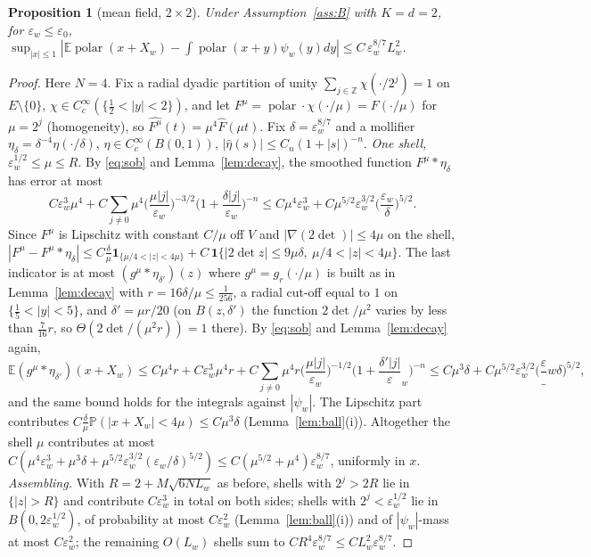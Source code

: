 \documentclass[10pt]{article}
\newtheorem{proposition}[theorem]{Proposition}
\theoremstyle{definition}
\theoremstyle{remark}
\newcommand{\Z}{\mathbb{Z}}
\newcommand{\E}{\mathbb{E}}
\newcommand{\Prob}{\mathbb{P}}
\newcommand{\polar}{\operatorname{polar}}
\newcommand{\ew}{\varepsilon_w}
\newcommand{\Lw}{L_w}
\begin{document}
\begin{proposition}[mean field, $2\times2$]\label{prop:field2}
Under Assumption~\ref{ass:B} with $K=d=2$, for $\ew\le\varepsilon_0$,
$\sup_{|x|\le1}|\E\polar(x+X_w)-\int\polar(x+y)\psi_w(y)dy|\le C\,\ew^{8/7}\Lw^2$.
\end{proposition}
\begin{proof}
Here $N=4$. Fix a radial dyadic partition of unity $\sum_{j\in\Z}\chi(\cdot/2^j)=1$ on $E\setminus\{0\}$,
$\chi\in C_c^\infty(\{\frac12<|y|<2\})$, and let $F^\mu=\polar\cdot\chi(\cdot/\mu)=F(\cdot/\mu)$ for $\mu=2^j$ (homogeneity),
so $\widehat{F^\mu}(t)=\mu^4\widehat F(\mu t)$. Fix $\delta=\ew^{8/7}$ and a mollifier $\eta_\delta=\delta^{-4}\eta(\cdot/\delta)$,
$\eta\in C_c^\infty(B(0,1))$, $|\widehat\eta(s)|\le C_n(1+|s|)^{-n}$. \emph{One shell,} $\ew^{1/2}\le\mu\le R$.
By \eqref{eq:sob} and Lemma~\ref{lem:decay}, the smoothed function $F^\mu*\eta_\delta$ has error at most
\[
C\ew^3\mu^4+C\sum_{j\ne0}\mu^4\Big(\frac{\mu|j|}{\ew}\Big)^{-3/2}\Big(1+\frac{\delta|j|}{\ew}\Big)^{-n}
\le C\mu^4\ew^3+C\mu^{5/2}\ew^{3/2}\Big(\frac{\ew}\delta\Big)^{5/2}.
\]
Since $F^\mu$ is Lipschitz with constant $C/\mu$ off $V$ and $|\nabla(2\det)|\le4\mu$ on the shell,
$|F^\mu-F^\mu*\eta_\delta|\le C\frac\delta\mu\mathbf 1_{\{\mu/4<|z|<4\mu\}}+C\,\mathbf 1\{|2\det z|\le9\mu\delta,\ \mu/4<|z|<4\mu\}$.
The last indicator is at most $(g^\mu*\eta_{\delta'})(z)$ where $g^\mu=g_r(\cdot/\mu)$ is built as in
Lemma~\ref{lem:decay} with $r=16\delta/\mu\le\frac1{256}$, a radial cut-off equal to $1$ on $\{\frac15<|y|<5\}$, and
$\delta'=\mu r/20$ (on $B(z,\delta')$ the function $2\det/\mu^2$ varies by less than $\frac7{16}r$, so
$\Theta(2\det/(\mu^2r))=1$ there). By \eqref{eq:sob} and Lemma~\ref{lem:decay} again,
\[
\E(g^\mu*\eta_{\delta'})(x+X_w)\le C\mu^4r+C\ew^3\mu^4r+C\sum_{j\ne0}\mu^4r\Big(\frac{\mu|j|}{\ew}\Big)^{-1/2}\Big(1+\frac{\delta'|j|}\ew\Big)^{-n}
\le C\mu^3\delta+C\mu^{5/2}\ew^{3/2}\Big(\frac\ew\delta\Big)^{5/2},
\]
and the same bound holds for the integrals against $|\psi_w|$. The Lipschitz part contributes $C\frac\delta\mu\Prob(|x+X_w|<4\mu)\le C\mu^3\delta$ (Lemma~\ref{lem:ball}(i)). Altogether the
shell $\mu$ contributes at most
$C(\mu^4\ew^3+\mu^3\delta+\mu^{5/2}\ew^{3/2}(\ew/\delta)^{5/2})\le C(\mu^{5/2}+\mu^4)\ew^{8/7}$, uniformly in $x$.
\emph{Assembling.} With $R=2+M\sqrt{6N\Lw}$ as before, shells with $2^j>2R$ lie in $\{|z|>R\}$ and contribute $C\ew^3$ in total on both sides;
shells with $2^j<\ew^{1/2}$ lie in $B(0,2\ew^{1/2})$, of probability at most $C\ew^{2}$ (Lemma~\ref{lem:ball}(i)) and of
$|\psi_w|$-mass at most $C\ew^2$; the remaining $O(\Lw)$ shells sum to $CR^4\ew^{8/7}\le C\Lw^2\ew^{8/7}$.
\end{proof}
\end{document}
